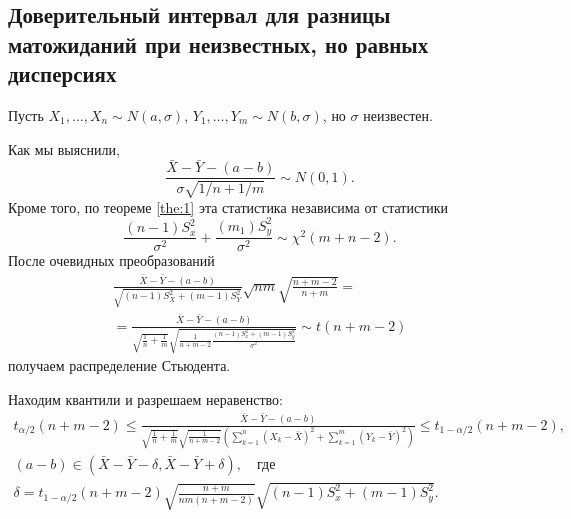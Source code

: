 \subsection{Доверительный интервал для разницы матожиданий при неизвестных, но равных дисперсиях}
\begin{ex}[для $\Delta a$ при неизвестном $ \sigma_1 = \sigma_2 $]
Пусть $X_1, \dots, X_n \sim N(a, \sigma)$, $Y_1, \dots, Y_m \sim N(b, \sigma)$,
но $\sigma$ неизвестен.

Как мы выяснили,
\[
  \frac{\bar X - \bar Y - (a-b)}{\sigma \sqrt{1/n + 1/m}} \sim N(0, 1).
\]
Кроме того, по теореме \ref{the:1} эта статистика независима от статистики
\[
	\frac{(n-1)S_x^2}{\sigma^2} + \frac{(m_1) S_y^2}{\sigma^2} \sim \chi^2(m+n-2).
\]
После очевидных преобразований 
\begin{multline*}
	\frac{\bar X - \bar Y - (a-b)}{\sqrt{(n-1)S^2_X+(m-1)S^2_Y}} \sqrt{nm}
	\sqrt{\frac{n+m -2}{n+m}}= \\ =
	\frac{\bar X - \bar Y - (a-b)}{\sqrt{\frac1n + \frac1m}
	\sqrt{\frac{1}{n+m-2} \frac{(n-1) S_x^2 + (m-1)S_y^2}{\sigma^2}}} \sim
	t(n+m-2)
\end{multline*}
получаем распределение Стьюдента.

Находим квантили и разрешаем неравенство:
\begin{gather*}
	t_{\alpha/2}(n+m-2) \leqslant \frac{\bar X - \bar Y - (a-b)}{\sqrt{
	\frac{1}{n}+ \frac{1}{m}} \sqrt{ \frac{1}{n+m - 2}} \left( \sum_{k=1}^n \left(
X_k - \bar X\right)^2 + \sum_{k=1}^m \left( Y_k - \bar Y \right)^2 \right) }
\leqslant t_{1-\alpha/2} (n+m-2),\\
	(a-b) \in (\bar X - \bar Y - \delta, \bar X - \bar Y + \delta), \quad
	\text{где}\\
\delta = t_{1-\alpha/2} (n+m-2) \sqrt{\frac{n+m}{nm(n+m-2)}} \sqrt{(n-1)S_x^2 +
(m-1) S_y^2}.
\end{gather*}
\end{ex}

